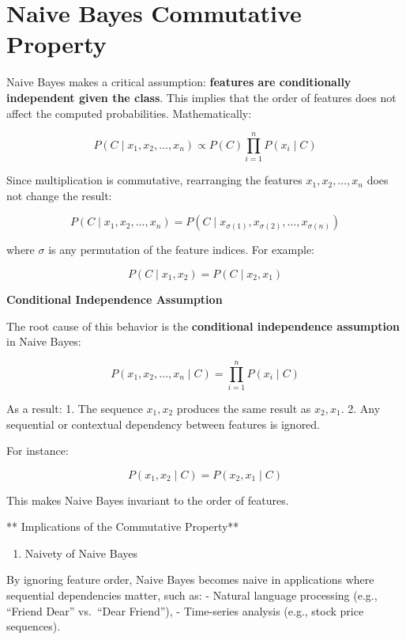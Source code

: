 \documentclass[
  12 pt,
  a4paper,
]{book}
\providecommand{\tightlist}{%
  \setlength{\itemsep}{0pt}\setlength{\parskip}{0pt}}
\numberwithin{equation}{section}
\theoremstyle{plain}      %
\theoremstyle{definition} %
\theoremstyle{remark}     %
\theoremstyle{note}         %
\begin{document}
\normalsize

\newpage

\hypertarget{naive-bayes-commutative-property}{%
\section{Naive Bayes Commutative
Property}\label{naive-bayes-commutative-property}}

Naive Bayes makes a critical assumption: \textbf{features are
conditionally independent given the class}. This implies that the order
of features does not affect the computed probabilities. Mathematically:

\[
P(C \mid x_1, x_2, \ldots, x_n) \propto P(C) \prod_{i=1}^n P(x_i \mid C)
\]

Since multiplication is commutative, rearranging the features
\(x_1, x_2, \ldots, x_n\) does not change the result:

\[
P(C \mid x_1, x_2, \ldots, x_n) = P(C \mid x_{\sigma(1)}, x_{\sigma(2)}, \ldots, x_{\sigma(n)})
\]

where \(\sigma\) is any permutation of the feature indices. For example:

\[
P(C \mid x_1, x_2) = P(C \mid x_2, x_1)
\]

\textbf{Conditional Independence Assumption}

The root cause of this behavior is the \textbf{conditional independence
assumption} in Naive Bayes:

\[
P(x_1, x_2, \ldots, x_n \mid C) = \prod_{i=1}^n P(x_i \mid C)
\]

As a result: 1. The sequence \(x_1, x_2\) produces the same result as
\(x_2, x_1\). 2. Any sequential or contextual dependency between
features is ignored.

For instance:

\[
P(x_1, x_2 \mid C) = P(x_2, x_1 \mid C)
\]

This makes Naive Bayes invariant to the order of features.

** Implications of the Commutative Property**

\begin{enumerate}
\def\labelenumi{\arabic{enumi}.}
\tightlist
\item
  Naivety of Naive Bayes
\end{enumerate}

By ignoring feature order, Naive Bayes becomes naive in applications
where sequential dependencies matter, such as: - Natural language
processing (e.g., ``Friend Dear'' vs.~``Dear Friend''), - Time-series
analysis (e.g., stock price sequences).
\end{document}
